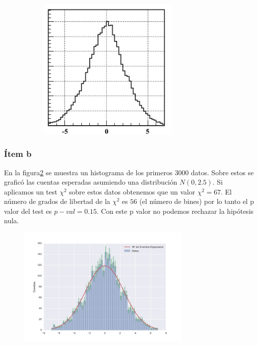 \begin{figure}
\begin{subfigure}[b]{0.3\textwidth}
\includegraphics[width=0.75\textwidth]{hist1.jpg}
\end{subfigure}
\caption[]{}
\label{fig:hists}
\end{figure}

\subsubsection*{Ítem b}
En la figura\ref{fig:fig2} se muestra un histograma de los primeros $3000$ datos.
Sobre estos se graficó las cuentas esperadas asumiendo una distribución $N(0, 2.5)$.
Si aplicamos un test $\chi^2$ sobre estos datos obtenemos que un valor $\chi^2=67$.
El número de grados de libertad de la $\chi^2$ es $56$ (el número de bines) por lo tanto el p valor del test es $p-val=0.15$.
Con este p valor no podemos rechazar la hipótesis nula.

\begin{figure}
\centering
\includegraphics[width=0.75\textwidth]{fig2.jpg}
\caption[]{}
\label{fig:fig2}
\end{figure}

